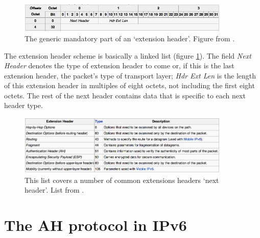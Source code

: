 \documentclass[final,a4paper,twoside,11pt,onecolumn]{report}
\begin{document}
\begin{figure}[here]
   \centering
   \includegraphics[width=0.9\textwidth]{wiki-ipv6-nextheader}
   \caption{The generic mandatory part of an `extension header'. Figure from \cite{wiki:ipv6_packet}.}
   \label{fig:wiki-ipv6-nextheader}
\end{figure}

The extension header scheme is basically a linked list (figure \ref{fig:wiki-ipv6-nextheader}). The field \emph{Next Header} denotes the type of extension header to come or, if this is the last extension header, the packet's type of transport layer; \emph{Hdr Ext Len} is the length of this extension header in multiples of eight octets, not including the first eight octets. The rest of the next header contains data that is specific to each next header type.

\begin{figure}[h!]
   \centering
   \includegraphics[width=0.9\textwidth]{wiki-ipv6-listofextensionheaders}
   \caption{This list covers a number of common extensions headers `next header'. List from \cite{wiki:ipv6_packet}.}
   \label{fig:wiki-ipv6-listofextensionheaders}
\end{figure}


\section{The AH protocol in IPv6}
\label{sec:bgah}
\end{document}
